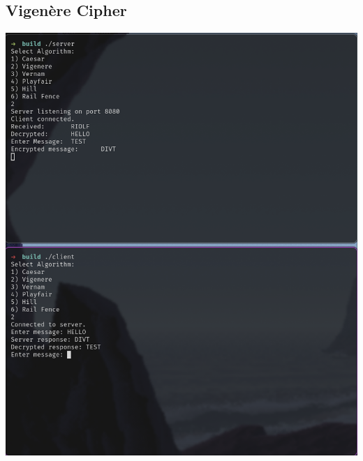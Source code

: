 \documentclass[titlepage]{article}
\begin{document}
\subsection{Vigenère Cipher}
\includegraphics[scale=0.4]{vigenere.png}
\end{document}
